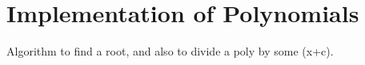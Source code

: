    
    \section{Implementation of Polynomials}
    Algorithm to find a root, and also to divide a poly by some (x+c).

